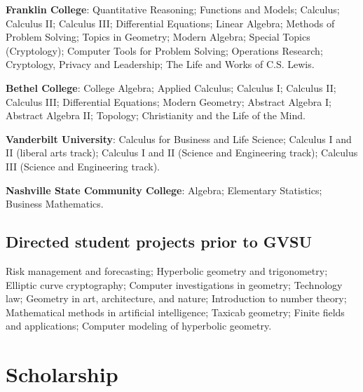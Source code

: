 \documentclass[letterpaper]{article}
\renewenvironment{itemize}{
  \begin{list}{}{
    \setlength{\leftmargin}{1.5em}
	\setlength{\itemsep}{0in}
  }
}{
  \end{list}
}
\begin{document}
\begin{itemize}
	\item \textbf{Franklin College}: Quantitative Reasoning; Functions and Models; Calculus; Calculus II; Calculus III; Differential Equations; Linear Algebra; Methods of Problem Solving; Topics in Geometry; Modern Algebra; Special Topics (Cryptology); Computer Tools for Problem Solving; Operations Research; Cryptology, Privacy and Leadership; The Life and Works of C.S. Lewis.  
	\item \textbf{Bethel College}: College Algebra; Applied Calculus; Calculus I; Calculus II; Calculus III; Differential Equations; Modern Geometry; Abstract Algebra I; Abstract Algebra II; Topology; Christianity and the Life of the Mind. 
	\item \textbf{Vanderbilt University}: Calculus for Business and Life Science; Calculus I and II (liberal arts track); Calculus I and II (Science and Engineering track); Calculus III (Science and Engineering track). 
	\item \textbf{Nashville State Community College}: Algebra; Elementary Statistics; Business Mathematics. 
\end{itemize}


\subsection*{Directed student projects prior to GVSU}

Risk management and forecasting; Hyperbolic geometry and trigonometry; Elliptic curve cryptography; Computer investigations in geometry; Technology law; Geometry in art, architecture, and nature; Introduction to number theory; Mathematical methods in artificial intelligence; Taxicab geometry; Finite fields and applications; Computer modeling of hyperbolic geometry. 


\section*{Scholarship}
\end{document}
